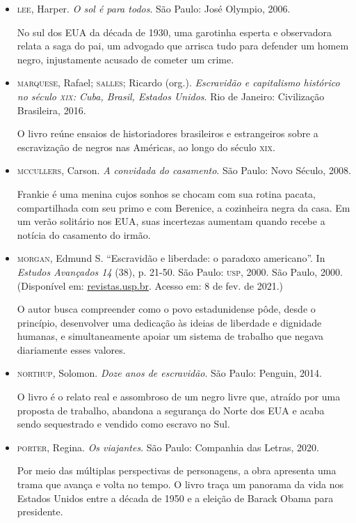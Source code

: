 \documentclass[12pt]{extarticle}
\begin{document}
\begin{itemize}
\item
\textsc{lee}, Harper. \textit{O sol é para todos}. São Paulo: José Olympio,
2006.

No sul dos EUA da década de 1930, uma garotinha esperta e observadora
relata a saga do pai, um advogado que arrisca tudo para defender um
homem negro, injustamente acusado de cometer um crime.

\item
\textsc{marquese}, Rafael; \textsc{salles}; Ricardo (org.). \textit{Escravidão e
  capitalismo histórico no século \textsc{xix}: Cuba, Brasil, Estados Unidos}.
  Rio de Janeiro: Civilização Brasileira, 2016.

O livro reúne ensaios de historiadores brasileiros e estrangeiros sobre
a escravização de negros nas Américas, ao longo do século \textsc{xix}.

\item
\textsc{mccullers}, Carson. \textit{A convidada do casamento}. São Paulo: Novo
  Século, 2008.

Frankie é uma menina cujos sonhos se chocam com sua rotina pacata,
compartilhada com seu primo e com Berenice, a cozinheira negra da casa.
Em um verão solitário nos EUA, suas incertezas aumentam quando recebe a
notícia do casamento do irmão.

\item
\textsc{morgan}, Edmund S. ``Escravidão e liberdade: o paradoxo americano''.
  In \textit{Estudos Avançados 14} (38), p. 21-50. São Paulo:
 \textsc{usp}, 2000. São Paulo, 2000. (Disponível em:
  \href{http://www.revistas.usp.br/eav/article/view/9507}{revistas.usp.br}.
  Acesso em: 8 de fev. de 2021.)

O autor busca compreender como o povo estadunidense pôde, desde o
princípio, desenvolver uma dedicação às ideias de liberdade e dignidade
humanas, e simultaneamente apoiar um sistema de trabalho que negava
diariamente esses valores.

\item
\textsc{northup}, Solomon. \textit{Doze anos de escravidão}. São Paulo:
Penguin, 2014.

O livro é o relato real e assombroso de um negro livre que, atraído por
uma proposta de trabalho, abandona a segurança do Norte dos EUA e acaba
sendo sequestrado e vendido como escravo no Sul.


\item
\textsc{porter}, Regina. \textit{Os viajantes}. São Paulo: Companhia das
  Letras, 2020.

Por meio das múltiplas perspectivas de personagens, a obra apresenta uma
trama que avança e volta no tempo. O livro traça um panorama da vida nos
Estados Unidos entre a década de 1950 e a eleição de Barack Obama para
presidente.


\end{itemize}
\end{document}
